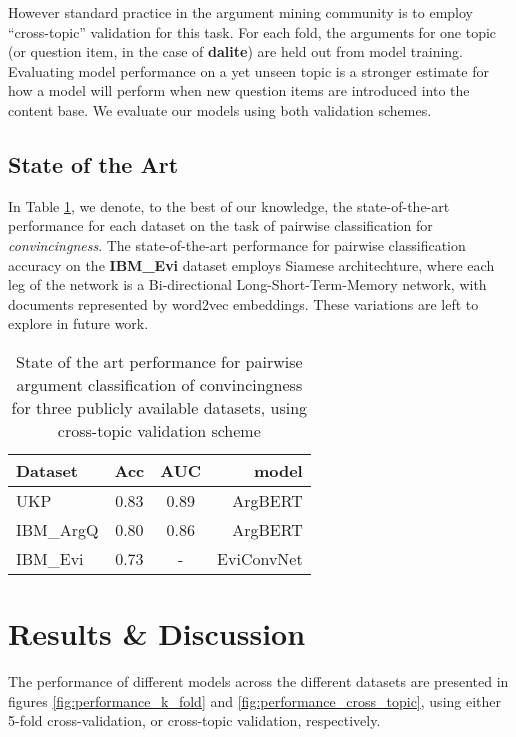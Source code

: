\documentclass[runningheads]{llncs}
\begin{document}
However standard practice in the argument mining community is to employ 
``cross-topic'' validation for this task. 
For each fold, the arguments for one topic (or question item, in the case of 
\textbf{dalite}) are held out from model training.
Evaluating model performance on a yet unseen topic is a stronger estimate for 
how a model will perform when new question items are introduced into the 
content base.
We evaluate our models using both validation schemes.

\subsection{State of the Art}
In Table \ref{tab:sota}, we denote, to the best of our knowledge, the 
state-of-the-art performance for each dataset on the task of pairwise 
classification for \textit{convincingness}. 
The state-of-the-art performance for pairwise classification accuracy on the 
\textbf{IBM\_Evi} dataset employs Siamese architechture\cite{gleize_are_2019}, 
where each leg of the network  is a Bi-directional Long-Short-Term-Memory 
network, with documents represented by word2vec embeddings. These variations 
are left to explore in future work.

\begin{table} 
\centering\begin{tabular}{l|*{2}{c}r}
	Dataset     & Acc & AUC & model  	   \\
	\hline
	UKP 		& 0.83 & 0.89 & ArgBERT\cite{toledo_automatic_2019}    \\
	IBM\_ArgQ   & 0.80 & 0.86 & ArgBERT\cite{toledo_automatic_2019}    \\
	IBM\_Evi    & 0.73 & - 	  & EviConvNet\cite{gleize_are_2019} \\
\end{tabular}
\caption{State of the art performance for pairwise argument classification of 
convincingness for three publicly available datasets, using cross-topic 
validation scheme}
\label{tab:sota}
\end{table}

\section{Results \& Discussion}

The performance of different models across the different datasets are presented 
in figures \ref{fig:performance_k_fold} and \ref{fig:performance_cross_topic}, 
using either 5-fold cross-validation, or cross-topic validation, respectively. 
\end{document}
